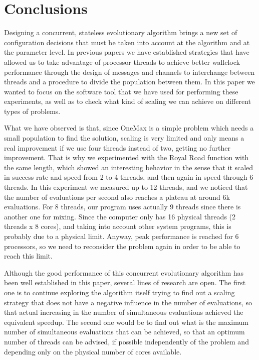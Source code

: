 \documentclass[sigconf]{acmart}\usepackage[]{graphicx}\usepackage[]{color}
\begin{document}
\section{Conclusions}
\label{sec:conclusions}

Designing a concurrent, stateless evolutionary algorithm brings a new
set of configuration decisions that must be taken into account at the algorithm and
at the parameter level. In previous papers we have established
strategies that have allowed us to take advantage of processor threads
to achieve better wallclock performance through the design of messages
and channels to interchange between threads and a procedure to divide
the population between them. In this paper we wanted to focus on the
software tool that we have used for performing these experiments, as
well as to check what kind of scaling we can achieve on different
types of problems. 


What we have observed is that, since OneMax is a simple problem which
needs a small population to find the solution, scaling is very limited
and only means a real improvement if we use four threads instead of
two, getting no further improvement. That is why we experimented with
the Royal Road function with the same length, which showed an
interesting behavior in the sense that it scaled in success rate and
speed from 2 to 4 threads, and then again in speed through 6
threads. In this experiment we measured up to 12 threads, and we
noticed that the number of evaluations per second also reaches a
plateau at around 6k evaluations. For 8 threads, our program uses
actually 9 threads since there is another one for mixing. Since the
computer only has 16 physical threads (2 threads x 8 cores), and
taking into account other system programs, this is probably due to a
physical limit. Anyway, peak performance is reached for 6 processors,
so we need to reconsider the problem again in order to be able to
reach this limit.


Although the good performance of this concurrent evolutionary
algorithm has been well established in this paper, several lines of
research are open. The first one is to continue exploring the
algorithm itself trying to find out a scaling strategy that does not
have a negative influence in the number of evaluations, so that actual
increasing in the number of simultaneous evaluations achieved the
equivalent speedup. The second one would be to find out what is the
maximum number of simultaneous evaluations that can be achieved, so
that an optimum number of threads can be advised, if possible
independently of the problem and depending only on the physical number
of cores available.
\end{document}
